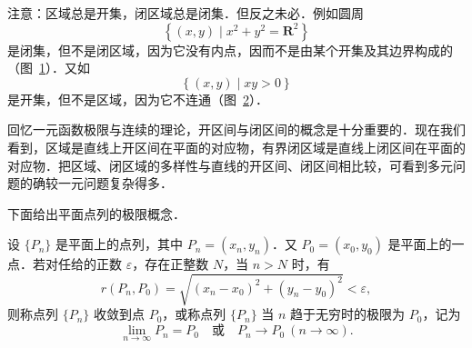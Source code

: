 注意：区域总是开集，闭区域总是闭集．但反之未必．例如圆周
\[
\left\{(x,y)\mid x^{2}+y^{2}=\mathbf{R}^{2}\right\}
\]
是闭集，但不是闭区域，因为它没有内点，因而不是由某个开集及其边界构成的（图~\ref{fig:15-7}）．又如
\[
\left\{(x,y)\mid xy>0\right\}
\]
是开集，但不是区域，因为它不连通（图~\ref{fig:15-8}）．

\begin{figure}[htbp]
\centering
{}\caption{\relax}\label{fig:15-7}
\end{figure}

\begin{figure}[htbp]
\centering
{}\caption{\relax}\label{fig:15-8}
\end{figure}

回忆一元函数极限与连续的理论，开区间与闭区间的概念是十分重要的．现在我们看到，区域是直线上开区间在平面的对应物，有界闭区域是直线上闭区间在平面的对应物．把区域、闭区域的多样性与直线的开区间、闭区间相比较，可看到多元问题的确较一元问题复杂得多．

下面给出平面点列的极限概念．

\begin{definition}\label{def:15-1}
设 $\{P_{n}\}$ 是平面上的点列，其中 $P_{n}=(x_{n},y_{n})$．又 $P_{0}=(x_{0},y_{0})$ 是平面上的一点．若对任给的正数 $\varepsilon$，存在正整数 $N$，当 $n>N$ 时，有
\begin{equation}
r\left(P_{n},P_{0}\right)=\sqrt{\left(x_{n}-x_{0}\right)^{2}+\left(y_{n}-y_{0}\right)^{2}}<\varepsilon,
\tag{1}
\end{equation}
则称点列 $\{P_{n}\}$ 收敛到点 $P_{0}$，或称点列 $\{P_{n}\}$ 当 $n$ 趋于无穷时的极限为 $P_{0}$，记为
\[
\lim_{n\to\infty}P_{n}=P_{0}\quad\text{或}\quad P_{n}\to P_{0}\ (n\to\infty).
\]
\end{definition}

